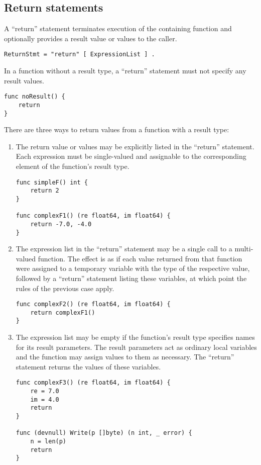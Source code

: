 \subsection*{Return statements}

A ``return'' statement terminates execution of the containing function
and optionally provides a result value or values to the caller.

\begin{Verbatim}[frame=single]
ReturnStmt = "return" [ ExpressionList ] .
\end{Verbatim}

In a function without a result type, a ``return'' statement must not
specify any result values.

\begin{Verbatim}[frame=single]
func noResult() {
    return
}
\end{Verbatim}

There are three ways to return values from a function with a result
type:

\begin{enumerate}
\item
  The return value or values may be explicitly listed in the ``return''
  statement. Each expression must be single-valued and
  assignable to the corresponding element of
  the function's result type.

\begin{Verbatim}[frame=single]
func simpleF() int {
    return 2
}

func complexF1() (re float64, im float64) {
    return -7.0, -4.0
}
\end{Verbatim}
\item
  The expression list in the ``return'' statement may be a single call
  to a multi-valued function. The effect is as if each value returned
  from that function were assigned to a temporary variable with the type
  of the respective value, followed by a ``return'' statement listing
  these variables, at which point the rules of the previous case apply.

\begin{Verbatim}[frame=single]
func complexF2() (re float64, im float64) {
    return complexF1()
}
\end{Verbatim}
\item
  The expression list may be empty if the function's result type
  specifies names for its result parameters. The result parameters
  act as ordinary local variables and the function may assign values to
  them as necessary. The ``return'' statement returns the values of
  these variables.

\begin{Verbatim}[frame=single]
func complexF3() (re float64, im float64) {
    re = 7.0
    im = 4.0
    return
}

func (devnull) Write(p []byte) (n int, _ error) {
    n = len(p)
    return
}
\end{Verbatim}
\end{enumerate}

